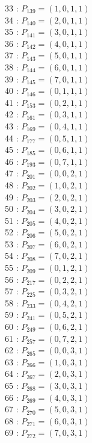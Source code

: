\documentclass{article}
\begin{document}
{\begin{multicols}{3}
33 : $P_{139}=( 1, 0, 1, 1 )$\\
34 : $P_{140}=( 2, 0, 1, 1 )$\\
35 : $P_{141}=( 3, 0, 1, 1 )$\\
36 : $P_{142}=( 4, 0, 1, 1 )$\\
37 : $P_{143}=( 5, 0, 1, 1 )$\\
38 : $P_{144}=( 6, 0, 1, 1 )$\\
39 : $P_{145}=( 7, 0, 1, 1 )$\\
40 : $P_{146}=( 0, 1, 1, 1 )$\\
41 : $P_{153}=( 0, 2, 1, 1 )$\\
42 : $P_{161}=( 0, 3, 1, 1 )$\\
43 : $P_{169}=( 0, 4, 1, 1 )$\\
44 : $P_{177}=( 0, 5, 1, 1 )$\\
45 : $P_{185}=( 0, 6, 1, 1 )$\\
46 : $P_{193}=( 0, 7, 1, 1 )$\\
47 : $P_{201}=( 0, 0, 2, 1 )$\\
48 : $P_{202}=( 1, 0, 2, 1 )$\\
49 : $P_{203}=( 2, 0, 2, 1 )$\\
50 : $P_{204}=( 3, 0, 2, 1 )$\\
51 : $P_{205}=( 4, 0, 2, 1 )$\\
52 : $P_{206}=( 5, 0, 2, 1 )$\\
53 : $P_{207}=( 6, 0, 2, 1 )$\\
54 : $P_{208}=( 7, 0, 2, 1 )$\\
55 : $P_{209}=( 0, 1, 2, 1 )$\\
56 : $P_{217}=( 0, 2, 2, 1 )$\\
57 : $P_{225}=( 0, 3, 2, 1 )$\\
58 : $P_{233}=( 0, 4, 2, 1 )$\\
59 : $P_{241}=( 0, 5, 2, 1 )$\\
60 : $P_{249}=( 0, 6, 2, 1 )$\\
61 : $P_{257}=( 0, 7, 2, 1 )$\\
62 : $P_{265}=( 0, 0, 3, 1 )$\\
63 : $P_{266}=( 1, 0, 3, 1 )$\\
64 : $P_{267}=( 2, 0, 3, 1 )$\\
65 : $P_{268}=( 3, 0, 3, 1 )$\\
66 : $P_{269}=( 4, 0, 3, 1 )$\\
67 : $P_{270}=( 5, 0, 3, 1 )$\\
68 : $P_{271}=( 6, 0, 3, 1 )$\\
69 : $P_{272}=( 7, 0, 3, 1 )$\\

\end{multicols}}
\end{document}
